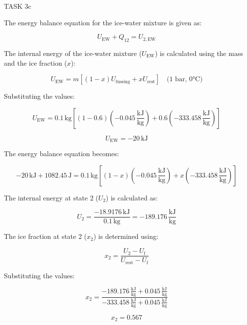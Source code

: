 TASK 3c

The energy balance equation for the ice-water mixture is given as:

\[
U_{\text{EW}} + Q_{12} = U_{2,\text{EW}}
\]

The internal energy of the ice-water mixture (\( U_{\text{EW}} \)) is calculated using the mass and the ice fraction (\( x \)):

\[
U_{\text{EW}} = m \left[ (1-x) U_{\text{fussing}} + x U_{\text{rest}} \right] \quad \text{(1 bar, 0°C)}
\]

Substituting the values:

\[
U_{\text{EW}} = 0.1 \, \text{kg} \left[ (1-0.6)(-0.045 \, \frac{\text{kJ}}{\text{kg}}) + 0.6(-333.458 \, \frac{\text{kJ}}{\text{kg}}) \right]
\]

\[
U_{\text{EW}} = -20 \, \text{kJ}
\]

The energy balance equation becomes:

\[
-20 \, \text{kJ} + 1082.45 \, \text{J} = 0.1 \, \text{kg} \left[ (1-x)(-0.045 \, \frac{\text{kJ}}{\text{kg}}) + x(-333.458 \, \frac{\text{kJ}}{\text{kg}}) \right]
\]

The internal energy at state 2 (\( U_2 \)) is calculated as:

\[
U_2 = \frac{-18.9176 \, \text{kJ}}{0.1 \, \text{kg}} = -189.176 \, \frac{\text{kJ}}{\text{kg}}
\]

The ice fraction at state 2 (\( x_2 \)) is determined using:

\[
x_2 = \frac{U_2 - U_{\text{f}}}{U_{\text{rest}} - U_{\text{f}}}
\]

Substituting the values:

\[
x_2 = \frac{-189.176 \, \frac{\text{kJ}}{\text{kg}} + 0.045 \, \frac{\text{kJ}}{\text{kg}}}{-333.458 \, \frac{\text{kJ}}{\text{kg}} + 0.045 \, \frac{\text{kJ}}{\text{kg}}}
\]

\[
x_2 = 0.567
\]